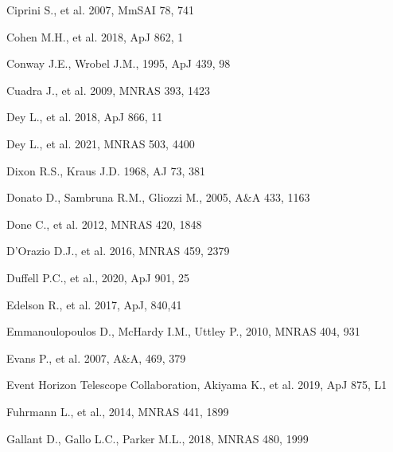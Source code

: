 \documentclass[preprints,article,accept,moreauthors,pdftex]{Definitions/mdpi}
\begin{document}
\begin{thebibliography}{999}
Ciprini S., et al. 2007, MmSAI 78, 741

Cohen M.H., et al. 2018, ApJ 862, 1

Conway J.E., Wrobel J.M., 1995, ApJ 439, 98

Cuadra J., et al. 2009, MNRAS 393, 1423

Dey L., et al. 2018, ApJ 866, 11

Dey L., et al. 2021, MNRAS 503, 4400

Dixon R.S., Kraus J.D. 1968, AJ 73, 381

Donato D., Sambruna R.M., Gliozzi M., 2005, A\&A 433, 1163

Done C., et al. 2012, MNRAS 420, 1848

D'Orazio D.J., et al. 2016, MNRAS 459, 2379 

Duffell P.C., et al., 2020, ApJ 901, 25

Edelson R., et al. 2017, ApJ, 840,41

Emmanoulopoulos D., McHardy I.M., Uttley P., 2010, MNRAS 404, 931 

Evans P., et al. 2007, A\&A, 469, 379 

Event Horizon Telescope Collaboration, Akiyama K., et al. 2019, ApJ 875, L1

Fuhrmann L., et al., 2014, MNRAS 441, 1899

Gallant D., Gallo L.C., Parker M.L., 2018,  MNRAS 480, 1999


\end{thebibliography}
\end{document}
